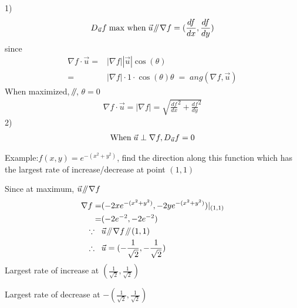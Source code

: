 \documentclass{article}
\newcommand{\parallelsum}{\mathbin{\!/\mkern-5mu/\!}}
\begin{document}
        1)
            \begin{align}
                D_{\vec{u}}f\text{\;max when\;}\vec{u}\parallelsum \nabla f = (\frac{df}{dx},\frac{df}{dy})
            \end{align}
        \;\;\;\;since
            \begin{align}
                \nabla f\cdot\vec{u} =& |\nabla f||\vec{u}|\cos(\theta)\\
                =&|\nabla f|\cdot 1\cdot\cos(\theta)\theta\;=\;ang(\nabla f,\vec{u})
            \end{align}
        \;\;\;\;When maximized, $\parallelsum$, $\theta = 0$
            \begin{align}
                \nabla f\cdot\vec{u} = |\nabla f| = \sqrt{\frac{df}{dx}^2+\frac{df}{dy}^2}
            \end{align}
        2)  
            \begin{align}
                \text{When\;}\vec{u}\perp\nabla f, D_{\vec{u}}f=0
            \end{align}
            \begin{center}
            \end{center}
        Example:$f(x,y) = e^{-(x^2+y^2)}$, find the direction along this function which has the largest rate of increase/decrease at point $(1,1)$
        
        Since at maximum, $\vec{u}\parallelsum\nabla f$
        \begin{align}
            \nabla f =& (-2xe^{-(x^2+y^2)}, -2ye^{-(x^2+y^2)})|_{(1,1)}\\
            =& (-2e^{-2},-2e^{-2})\\
            \because\;\;\;&\vec{u}\parallelsum\nabla f\parallelsum(1,1)\\
            \therefore\;\;\;&\vec{u} = (-\frac{1}{\sqrt{2}},-\frac{1}{\sqrt{2}})
        \end{align}
        Largest rate of increase at $ (\frac{1}{\sqrt{2}},\frac{1}{\sqrt{2}})$
        
        Largest rate of decrease at $-(\frac{1}{\sqrt{2}},\frac{1}{\sqrt{2}})$
        
\end{document}
